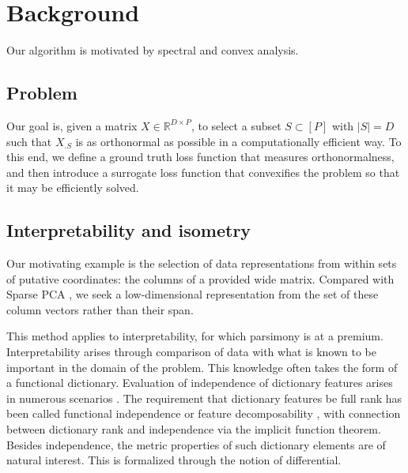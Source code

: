 \section{Background}

Our algorithm is motivated by spectral and convex analysis.

\subsection{Problem}

Our goal is, given a matrix $ X \in \mathbb R^{D \times P}$, to select a subset $ S \subset [P]$ with $| S| = D$ such that $X_{.  S}$ is as orthonormal as possible in a computationally efficient way.
To this end, we define a ground truth loss function that measures orthonormalness, and then introduce a surrogate loss function that convexifies the problem so that it may be efficiently solved.


\subsection{Interpretability and isometry}

Our motivating example is the selection of data representations from within sets of putative coordinates: the columns of a provided wide matrix.
Compared with Sparse PCA \citep{Dey2017-mx, Bertsimas2022-qo, Bertsimas2022-dv}, we seek a low-dimensional representation from the set of these column vectors rather than their span.

This method applies to interpretability, for which parsimony is at a premium.
Interpretability arises through comparison of data with what is known to be important in the domain of the problem.
This knowledge often takes the form of a functional dictionary.
Evaluation of independence of dictionary features arises in numerous scenarios \citep{Chen2019-km, Koelle2022-ju, He2023-ch}.
The requirement that dictionary features be full rank has been called functional independence \citep{Koelle2022-ju} or feature decomposability \citep{templeton2024scaling}, with connection between dictionary rank and independence via the implicit function theorem.
Besides independence, the metric properties of such dictionary elements are of natural interest.
This is formalized through the notion of differential.

